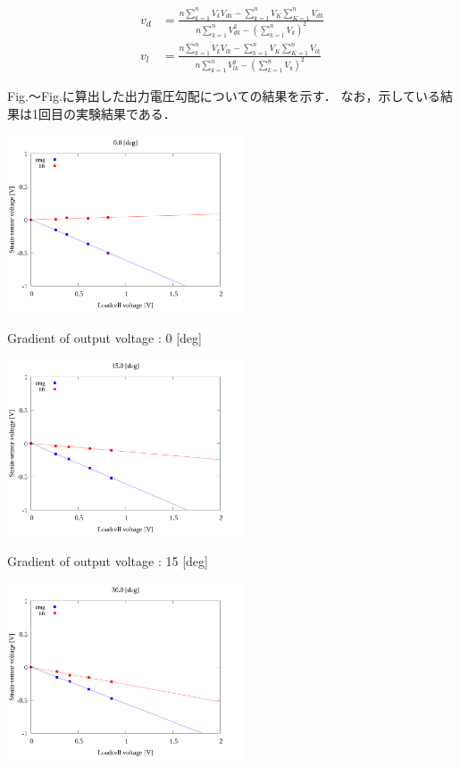 \begin{eqnarray}
    \displaystyle v_d &= \frac{n\sum^n_{k=1} V_{k} V_{dk} - \sum^n_{k=1} V_{K} \sum^n_{K=1} V_{dk}}{n\sum^n_{k=1}V_{dk}^2 - \left(\sum^n_{k=1}V_k\right)^2}\\ 
    \displaystyle v_l &= \frac{n\sum^n_{k=1} V_{k} V_{lk} - \sum^n_{k=1} V_{K} \sum^n_{K=1} V_{lk}}{n\sum^n_{k=1}V_{lk}^2 - \left(\sum^n_{k=1}V_k\right)^2}
\end{eqnarray}

Fig.～Fig.に算出した出力電圧勾配についての結果を示す．
なお，示している結果は1回目の実験結果である．

\begin{multicols}{2}
    \begin{figure_here}
        \begin{center}
            \includegraphics[width=70mm]{../../02_workspace/result/2-1/plot/04/04_linear_0.png}
            \caption{Gradient of output voltage : 0 [deg]}
            \includegraphics[width=70mm]{../../02_workspace/result/2-1/plot/04/04_linear_150.png}
            \caption{Gradient of output voltage : 15 [deg]}
            \includegraphics[width=70mm]{../../02_workspace/result/2-1/plot/04/04_linear_300.png}

\end{center}
\end{figure_here}
\end{multicols}
